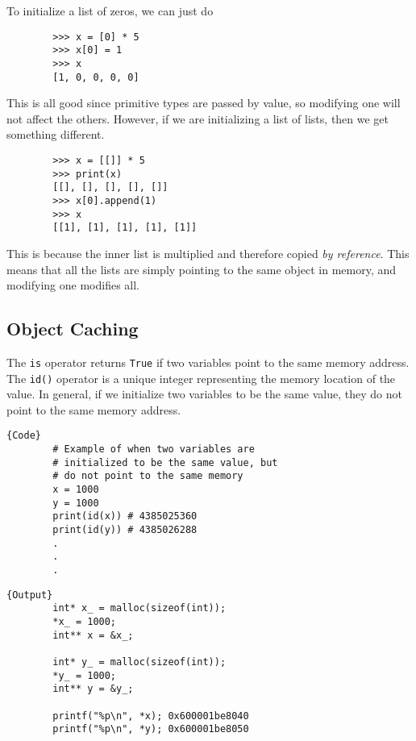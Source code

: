 \documentclass{article}
\begin{document}
    \begin{example}
      To initialize a list of zeros, we can just do 
      \begin{lstlisting}
        >>> x = [0] * 5
        >>> x[0] = 1
        >>> x
        [1, 0, 0, 0, 0] 
      \end{lstlisting}
      This is all good since primitive types are passed by value, so modifying one will not affect the others. However, if we are initializing a list of lists, then we get something different. 
      \begin{lstlisting}
        >>> x = [[]] * 5
        >>> print(x)
        [[], [], [], [], []]
        >>> x[0].append(1)
        >>> x
        [[1], [1], [1], [1], [1]] 
      \end{lstlisting}
      This is because the inner list is multiplied and therefore copied \textit{by reference}. This means that all the lists are simply pointing to the same object in memory, and modifying one modifies all.  
    \end{example}

    \subsection{Object Caching}

      The \texttt{is} operator returns \texttt{True} if two variables point to the same memory address. The \texttt{id()} operator is a unique integer representing the memory location of the value. In general, if we initialize two variables to be the same value, they do not point to the same memory address. 

      \noindent\begin{minipage}{.5\textwidth}
      \begin{lstlisting}[]{Code}
        # Example of when two variables are 
        # initialized to be the same value, but 
        # do not point to the same memory
        x = 1000
        y = 1000
        print(id(x)) # 4385025360
        print(id(y)) # 4385026288 
        .
        .
        .
      \end{lstlisting}
      \end{minipage}
      \hfill
      \begin{minipage}{.49\textwidth}
      \begin{lstlisting}[]{Output}
        int* x_ = malloc(sizeof(int)); 
        *x_ = 1000; 
        int** x = &x_; 

        int* y_ = malloc(sizeof(int)); 
        *y_ = 1000; 
        int** y = &y_; 

        printf("%p\n", *x); 0x600001be8040 
        printf("%p\n", *y); 0x600001be8050 
      \end{lstlisting}
      \end{minipage}
\end{document}
